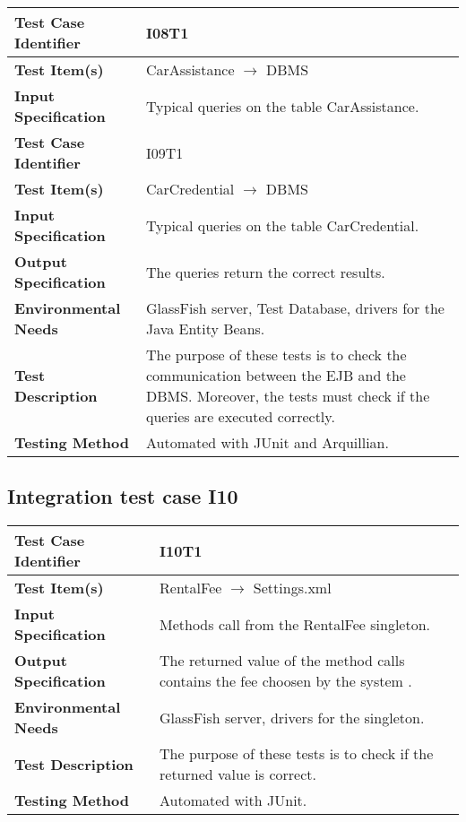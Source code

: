 \begin{tabular}{l p{}}
    \hline
    \textbf{Test Case Identifier} & I08T1\\
    \hline
    \textbf{Test Item(s)} & CarAssistance $\rightarrow$ DBMS \\
    \hline
    \textbf{Input Specification} & Typical queries on the table CarAssistance. \\
    \hline
    \hline
    \textbf{Test Case Identifier} & I09T1\\
    \hline
    \textbf{Test Item(s)} & CarCredential $\rightarrow$ DBMS \\
    \hline
    \textbf{Input Specification} & Typical queries on the table CarCredential. \\
    \hline
    \hline
    \textbf{Output Specification} & The queries return the correct results. \\
    \hline
    \textbf{Environmental Needs} & GlassFish server, Test Database, drivers for the Java Entity Beans. \\
    \hline
    \textbf{Test Description} & The purpose of these tests is to check the communication between the EJB and the DBMS. Moreover, the tests must check if the queries are executed correctly.  \\
    \hline
    \textbf{Testing Method} & Automated with JUnit and Arquillian. \\
    \hline
\end{tabular}

\vspace{2em}

\subsection {Integration test case I10}

\indent

\vspace{1em}

\begin{tabular}{l p{}}
    \hline
    \textbf{Test Case Identifier} & I10T1\\
    \hline
    \textbf{Test Item(s)} & RentalFee $\rightarrow$ Settings.xml \\
    \hline
    \textbf{Input Specification} &  Methods call from the RentalFee singleton. \\
    \hline
    \textbf{Output Specification} & The returned value of the method calls contains the fee choosen by the system . \\
    \hline
    \textbf{Environmental Needs} & GlassFish server, drivers for the singleton. \\
    \hline
    \textbf{Test Description} & The purpose of these tests is to check if the returned value is correct.  \\
    \hline
    \textbf{Testing Method} & Automated with JUnit. \\
    \hline
\end{tabular}

